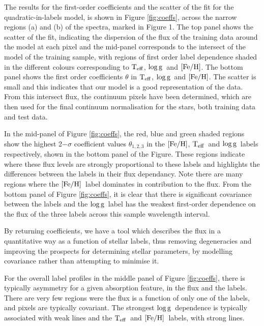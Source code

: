 \documentclass[12pt, preprint]{aastex}
\newcommand{\teff}{\mbox{$\rm T_{eff}$}}
\newcommand{\feh}{\mbox{$\rm [Fe/H]$}}
\newcommand{\logg}{\mbox{$\rm \log g$}}
\begin{document}
The results for the first-order coefficients and the scatter of the fit for the quadratic-in-labels model, is shown in Figure \ref{fig:coeffs}, across the narrow regions (a) and (b) of the spectra, marked in Figure 1. The top panel shows the scatter of the fit, indicating the dispersion of the flux of the training data around the model at each pixel and the mid-panel corresponds to the intersect of the model of the training sample, with regions of first order label dependence shaded in the different colours corresponding to \teff, \logg\ and \feh. The bottom panel shows the first order coefficients $\theta$ in \teff, \logg\ and \feh.  The scatter is small and this indicates that our model is a good representation of the data. From this intersect flux, the continuum pixels have been determined, which  are then used for the final continuum normalisation for the stars, both training data and test data. 

 In the mid-panel of Figure \ref{fig:coeffs}, the red, blue and green shaded regions show the highest 2$-\sigma$ coefficient values $\theta_{1,2,3}$ in the \feh, \teff\ and \logg\ labels respectively, shown in the bottom panel of the Figure. These regions indicate where these flux levels are strongly proportional to these labels and highlights the differences between the labels in their flux dependancy. Note there are many regions where the \feh\ label dominates in contribution to the flux. From the bottom panel of Figure \ref{fig:coeffs}, it is clear that there is significant covariance between the labels and the \logg\ label has the weakest first-order dependence on the flux of the three labels across this sample wavelength interval. 

By returning coefficients, we have a tool which describes the flux in a quantitative way as a function of stellar labels, thus removing degeneracies and improving the prospects for determining stellar parameters, by modelling covariance rather than attempting to minimise it. 

For the overall label profiles in the middle panel of Figure \ref{fig:coeffs}, there is typically asymmetry for a given absorption feature, in the flux and the labels. There are very few regions were the flux is a function of only one of the labels, and pixels are typically covariant. The strongest \logg\ dependence is typically associated with weak lines and the \teff\ and \feh\ labels, with strong lines. 
\end{document}

